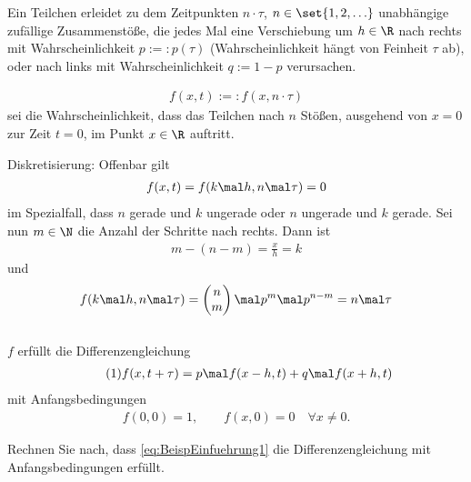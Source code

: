 \begin{beisp}\enter
	Ein Teilchen erleidet zu dem Zeitpunkten $n\cdot\tau$, $n\in\set{1,2,\ldots}$ unabhängige zufällige Zusammenstöße, 
	die jedes Mal eine Verschiebung um $h\in\R$ nach rechts mit Wahrscheinlichkeit $p:=:p(\tau)$ (Wahrscheinlichkeit hängt von Feinheit $\tau$ ab), 
	oder nach links mit Wahrscheinlichkeit $q:=1-p$ verursachen.
	
	\begin{notation}
		\begin{align*}
			f(x,t):=:f(x,n\cdot\tau)
		\end{align*}
		sei die Wahrscheinlichkeit, dass das Teilchen nach $n$ Stößen, ausgehend von $x=0$ zur Zeit $t=0$, im Punkt $x\in\R$ auftritt.
	\end{notation}
	Diskretisierung: Offenbar gilt
	\begin{align*}
		f(x,t)=f(k\mal h,n\mal\tau)=0
	\end{align*}
	im Spezialfall, dass  $n$ gerade und $k$ ungerade oder $n$ ungerade und $k$ gerade.
	Sei nun $m\in\N$ die Anzahl der Schritte nach rechts.
	Dann ist
	\begin{align*}
		m-(n-m)=\frac{x}{h}=k
	\end{align*}
	und 
	\begin{align*}
		f(k\mal h,n\mal\tau)=
		\begin{pmatrix}
			n\\
			m
		\end{pmatrix}
		\mal p^m\mal p^{n-m}
		=n\mal\tau
	\end{align*}
	\\
	$f$ erfüllt die Differenzengleichung
	\begin{align}\label{eq:BeispEinfuehrung1}\tag{1}
		f(x,t+\tau)=p\mal f(x-h,t)+q\mal f(x+h,t)
	\end{align}	 
	mit Anfangsbedingungen
	\begin{align*}
		f(0,0)=1,\qquad
		f(x,0)=0\quad
		\forall x\neq0.
	\end{align*}
	\begin{aufgabenr}\label{aufg:1}\enter
		Rechnen Sie nach, dass \eqref{eq:BeispEinfuehrung1} die Differenzengleichung mit Anfangsbedingungen erfüllt.
	\end{aufgabenr}


\end{beisp}
